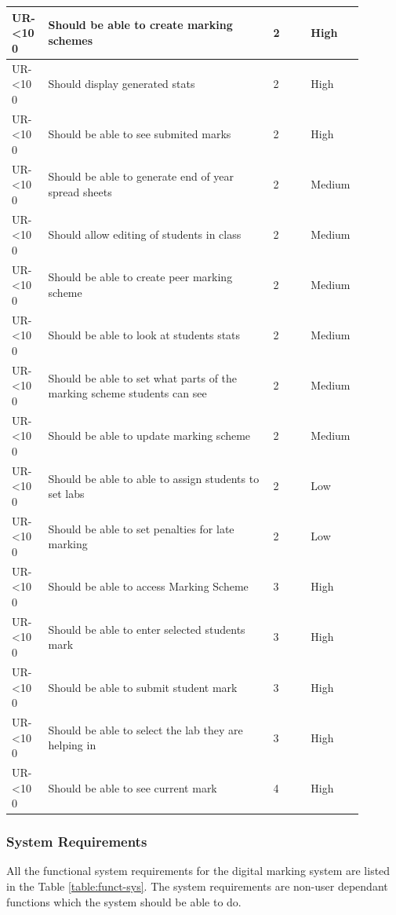 \documentclass[12pt]{article}  %
\newcommand{\rid}[1]{\centering #1-\ifnum\value{requirement}<10 0\fi\arabic{requirement} \stepcounter{requirement}}
\begin{document}
\begin{spacing}{1.2}
\begin{longtable}{|p{0.09\linewidth}|p{0.6\linewidth}|p{0.1\linewidth}|
p{0.1\linewidth}|}
\rid{UR} & Should be able to create marking schemes & 2 & High\\ \hline
\rid{UR} & Should display generated stats & 2 & High\\ \hline
\rid{UR} & Should be able to see submited marks & 2 & High\\ \hline
\rid{UR} & Should be able to generate end of year spread sheets & 2 & Medium\\ \hline
\rid{UR} & Should allow editing of students in class & 2 & Medium\\ \hline
\rid{UR} & Should be able to create peer marking scheme & 2 & Medium\\ \hline
\rid{UR} & Should be able to look at students stats & 2 & Medium\\ \hline
\rid{UR} & Should be able to set what parts of the marking scheme students can see & 2 & Medium\\ \hline
\rid{UR} & Should be able to update marking scheme & 2 & Medium \\ \hline
\rid{UR} & Should be able to able to assign students to set labs & 2 & Low \\ \hline
\rid{UR} & Should be able to set penalties for late marking & 2 & Low \\ \hline

\rid{UR} & Should be able to access Marking Scheme & 3 & High\\ \hline
\rid{UR} & Should be able to enter selected students mark & 3 & High\\ \hline
\rid{UR} & Should be able to submit student mark & 3 & High\\ \hline
\rid{UR} & Should be able to select the lab they are helping in & 3 & High\\ \hline


\rid{UR} & Should be able to see current mark & 4 & High\\ \hline

\end{longtable}
\end{spacing}
\setcounter{requirement}{1}

\newpage
\subsubsection{System Requirements}


All the functional system requirements for the digital marking system are listed in the Table \ref{table:funct-sys}. The system requirements are non-user dependant functions which the system should be able to do.
\end{document}
